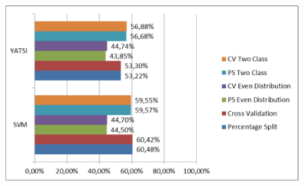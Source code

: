 \documentclass{beamer}
\begin{document}
\begin{frame}
	\begin{figure}
		\center
		\includegraphics[width=.8\textwidth]{./img/Accuracy2.pdf}
		\end{figure}
\end{frame}
\end{document}
